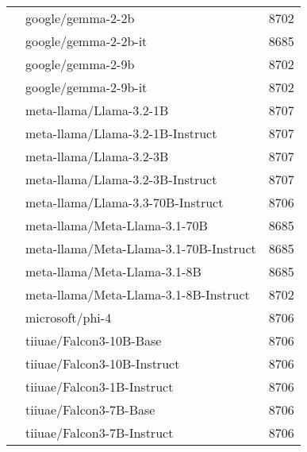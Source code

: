\begin{table}[]
\begin{tabular}{llr}
 & google/gemma-2-2b & 8702 \\
 & google/gemma-2-2b-it & 8685 \\
 & google/gemma-2-9b & 8702 \\
 & google/gemma-2-9b-it & 8702 \\
 & meta-llama/Llama-3.2-1B & 8707 \\
 & meta-llama/Llama-3.2-1B-Instruct & 8707 \\
 & meta-llama/Llama-3.2-3B & 8707 \\
 & meta-llama/Llama-3.2-3B-Instruct & 8707 \\
 & meta-llama/Llama-3.3-70B-Instruct & 8706 \\
 & meta-llama/Meta-Llama-3.1-70B & 8685 \\
 & meta-llama/Meta-Llama-3.1-70B-Instruct & 8685 \\
 & meta-llama/Meta-Llama-3.1-8B & 8685 \\
 & meta-llama/Meta-Llama-3.1-8B-Instruct & 8702 \\
 & microsoft/phi-4 & 8706 \\
 & tiiuae/Falcon3-10B-Base & 8706 \\
 & tiiuae/Falcon3-10B-Instruct & 8706 \\
 & tiiuae/Falcon3-1B-Instruct & 8706 \\
 & tiiuae/Falcon3-7B-Base & 8706 \\
 & tiiuae/Falcon3-7B-Instruct & 8706 \\
\bottomrule
\end{tabular}
    \label{tab:Qwen2.5-32B-Instruct}
\end{table}

